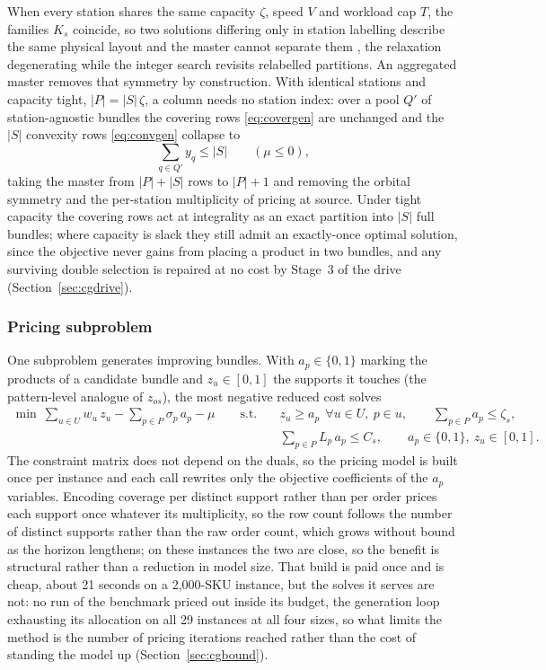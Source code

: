 \documentclass[]{interact}
\begin{document}
When every station shares the same capacity $\zeta$, speed $V$ and workload cap $T$, the families $K_s$ coincide, so two solutions differing only in station labelling describe the same physical layout and the master cannot separate them \citep{vanderbeck2000dw}, the relaxation degenerating while the integer search revisits relabelled partitions.\label{sec:cgagg} An aggregated master removes that symmetry by construction. With identical stations and capacity tight, $|P| = |S|\,\zeta$, a column needs no station index: over a pool $Q'$ of station-agnostic bundles the covering rows \eqref{eq:covergen} are unchanged and the $|S|$ convexity rows \eqref{eq:convgen} collapse to
\begin{equation}
\sum_{q \in Q'} y_q \le |S| \qquad (\mu \le 0),
\label{eq:card}
\end{equation}
taking the master from $|P|+|S|$ rows to $|P|+1$ and removing the orbital symmetry and the per-station multiplicity of pricing at source. Under tight capacity the covering rows act at integrality as an exact partition into $|S|$ full bundles; where capacity is slack they still admit an exactly-once optimal solution, since the objective never gains from placing a product in two bundles, and any surviving double selection is repaired at no cost by Stage~3 of the drive (Section~\ref{sec:cgdrive}).

\subsubsection{Pricing subproblem}\label{sec:cgpricing}
One subproblem generates improving bundles. With $a_p \in \{0,1\}$ marking the products of a candidate bundle and $z_u \in [0,1]$ the supports it touches (the pattern-level analogue of $z_{os}$), the most negative reduced cost solves
\[
\begin{aligned}
\min\ \sum_{u \in U} w_u\, z_u - \sum_{p \in P} \sigma_p\, a_p - \mu
\qquad \text{s.t.} \quad & z_u \ge a_p\ \ \forall u \in U,\ p \in u, \qquad \sum_{p \in P} a_p \le \zeta_s, \\
& \sum_{p \in P} L_p\, a_p \le C_s, \qquad a_p \in \{0,1\},\ z_u \in [0,1].
\end{aligned}
\]
The constraint matrix does not depend on the duals, so the pricing model is built once per instance and each call rewrites only the objective coefficients of the $a_p$ variables. Encoding coverage per distinct support rather than per order prices each support once whatever its multiplicity, so the row count follows the number of distinct supports rather than the raw order count, which grows without bound as the horizon lengthens; on these instances the two are close, so the benefit is structural rather than a reduction in model size. That build is paid once and is cheap, about 21 seconds on a 2,000-SKU instance, but the solves it serves are not: no run of the benchmark priced out inside its budget, the generation loop exhausting its allocation on all 29 instances at all four sizes, so what limits the method is the number of pricing iterations reached rather than the cost of standing the model up (Section~\ref{sec:cgbound}).
\end{document}
